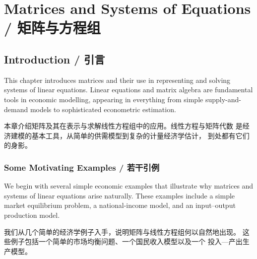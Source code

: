 \chapter{Matrices and Systems of Equations / 矩阵与方程组}

\section{Introduction / 引言}

\begin{original}
This chapter introduces matrices and their use in representing and
solving systems of linear equations.  Linear equations and matrix
algebra are fundamental tools in economic modelling, appearing in
everything from simple supply-and-demand models to sophisticated
econometric estimation.
\end{original}
\begin{translation}
本章介绍矩阵及其在表示与求解线性方程组中的应用。线性方程与矩阵代数
是经济建模的基本工具，从简单的供需模型到复杂的计量经济学估计，
到处都有它们的身影。
\end{translation}

\subsection{Some Motivating Examples / 若干引例}

\begin{original}
We begin with several simple economic examples that illustrate why
matrices and systems of linear equations arise naturally.  These
examples include a simple market equilibrium problem, a national-income
model, and an input–output production model.
\end{original}
\begin{translation}
我们从几个简单的经济学例子入手，说明矩阵与线性方程组何以自然地出现。
这些例子包括一个简单的市场均衡问题、一个国民收入模型以及一个
投入—产出生产模型。
\end{translation}

